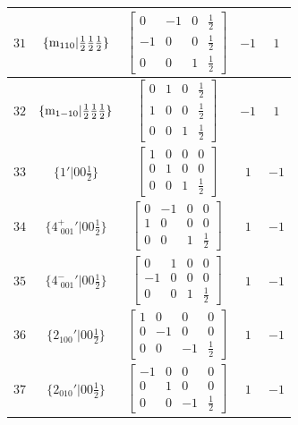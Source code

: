 \documentclass[fleqn,8pt]{jsarticle}
\begin{document}
\begin{longtable}{ccccc}
$ 31 $ & $ \{{\rm m}_{110}|\frac{1}{2} \frac{1}{2} \frac{1}{2}\} $ & $ \begin{bmatrix} 0 & -1 & 0 & \frac{1}{2} \\ -1 & 0 & 0 & \frac{1}{2} \\ 0 & 0 & 1 & \frac{1}{2} \end{bmatrix} $ & $ -1 $ & $ 1 $ \\ \hline
$ 32 $ & $ \{{\rm m}_{1-10}|\frac{1}{2} \frac{1}{2} \frac{1}{2}\} $ & $ \begin{bmatrix} 0 & 1 & 0 & \frac{1}{2} \\ 1 & 0 & 0 & \frac{1}{2} \\ 0 & 0 & 1 & \frac{1}{2} \end{bmatrix} $ & $ -1 $ & $ 1 $ \\ \hline
$ 33 $ & $ \{1{}'|0 0 \frac{1}{2}\} $ & $ \begin{bmatrix} 1 & 0 & 0 & 0 \\ 0 & 1 & 0 & 0 \\ 0 & 0 & 1 & \frac{1}{2} \end{bmatrix} $ & $ 1 $ & $ -1 $ \\ \hline
$ 34 $ & $ \{4^{+}_{\,\,001}{}'|0 0 \frac{1}{2}\} $ & $ \begin{bmatrix} 0 & -1 & 0 & 0 \\ 1 & 0 & 0 & 0 \\ 0 & 0 & 1 & \frac{1}{2} \end{bmatrix} $ & $ 1 $ & $ -1 $ \\ \hline
$ 35 $ & $ \{4^{-}_{\,\,001}{}'|0 0 \frac{1}{2}\} $ & $ \begin{bmatrix} 0 & 1 & 0 & 0 \\ -1 & 0 & 0 & 0 \\ 0 & 0 & 1 & \frac{1}{2} \end{bmatrix} $ & $ 1 $ & $ -1 $ \\ \hline
$ 36 $ & $ \{2{}_{100}{}'|0 0 \frac{1}{2}\} $ & $ \begin{bmatrix} 1 & 0 & 0 & 0 \\ 0 & -1 & 0 & 0 \\ 0 & 0 & -1 & \frac{1}{2} \end{bmatrix} $ & $ 1 $ & $ -1 $ \\ \hline
$ 37 $ & $ \{2{}_{010}{}'|0 0 \frac{1}{2}\} $ & $ \begin{bmatrix} -1 & 0 & 0 & 0 \\ 0 & 1 & 0 & 0 \\ 0 & 0 & -1 & \frac{1}{2} \end{bmatrix} $ & $ 1 $ & $ -1 $ \\ \hline

\end{longtable}
\end{document}
